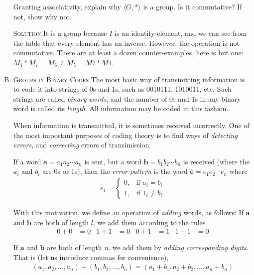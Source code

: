 \documentclass[twoside]{amsart}
\begin{document}
\begin{enumerate}[A.]
   Granting associativity, explain why $\langle G,* \rangle$ is a group.
   Is it commutative? If not, show why not.

   \noindent \textsc{Solution} It is a group because $I$ is an identity 
   element, and we can see from the table that every element has an
   inverse. However, the operation is not commutative. There are at least
   a dozen counter-examples, here is but one: $M_1*M_7=M_6\ne M_5=M7*M1$.

   \item \textsc{Groups in Binary Codes}
   \noindent The most basic way of transmitting information is to code it into
   strings of 0s and 1s, such as 0010111, 1010011, etc. Such strings are called
   \emph{binary words}, and the number of 0s and 1s in any binary word is
   called its \emph{length}. All information may be coded in this fashion.

   When information is transmitted, it is sometimes received incorrectly.
   One of the most important purposes of coding theory is to find ways of
   \emph{detecting errors}, and \emph{correcting} errors of transimission.

   If a word $\mathbf{a}=a_1 a_2 \cdots a_n$ is sent, but a word
   $\mathbf{b}=b_1 b_2 \cdots b_n$ is received (where the $a_i$ and $b_i$
   are 0s or 1s), then the \emph{error pattern} is the word
   $\mathbf{e}=e_1 e_2 \cdots e_n$ where
%
   \begin{gather*}
      e_i =
         \begin{cases}
	    0, & \text{if $a_i = b_i$} \\
	    1, & \text{if $1_i \ne b_i$}
	 \end{cases}
   \end{gather*}

   \noindent With this motivation, we define an operation of \emph{adding}
   words, as follows: If $\mathbf{a}$ and $\mathbf{b}$ are both of length $l$,
   we add them according to the rules
   \begin{align*}
      0 + 0 &= 0   &   1 + 1 & = 0   &   0 + 1 & = 1   &   1 + 1 & = 0
   \end{align*}

   \newcommand{\mbf}[1]{\ensuremath{\mathbf{#1}}}
   \noindent If \mbf{a} and \mbf{b} are both of length \emph{n}, we add them by
   \emph{adding corresponding digits}. That is (let us introduce commas for
   convenience),
   \begin{gather*}
     (a_1,a_2,\ldots,a_n) + (b_1,b_2,\ldots,b_n) = (a_1+b_1, a_2+b_2,
     \ldots,a_n+b_n)
   \end{gather*}


\end{enumerate}
\end{document}
